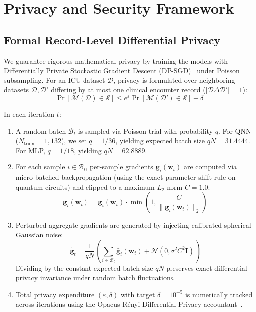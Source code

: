 \documentclass[conference]{IEEEtran}
\begin{document}
\section{Privacy and Security Framework}
\subsection{Formal Record-Level Differential Privacy}
We guarantee rigorous mathematical privacy by training the models with Differentially Private Stochastic Gradient Descent (\textsf{DP-SGD})~\cite{abadi2016deep} under Poisson subsampling. For an ICU dataset $\mathcal{D}$, privacy is formulated over neighboring datasets $\mathcal{D}, \mathcal{D}'$ differing by at most one clinical encounter record ($|\mathcal{D} \Delta \mathcal{D}'| = 1$):
\begin{equation}
    \Pr[\mathcal{M}(\mathcal{D}) \in \mathcal{S}] \le e^\varepsilon \Pr[\mathcal{M}(\mathcal{D}') \in \mathcal{S}] + \delta
\end{equation}

In each iteration $t$:
\begin{enumerate}
    \item A random batch $\mathcal{B}_t$ is sampled via Poisson trial with probability $q$. For QNN ($N_{\text{train}} = 1,132$), we set $q = 1/36$, yielding expected batch size $qN = 31.4444$. For MLP, $q = 1/18$, yielding $qN = 62.8889$.
    \item For each sample $i \in \mathcal{B}_t$, per-sample gradients $\mathbf{g}_i(\mathbf{w}_t)$ are computed via micro-batched backpropagation (using the exact parameter-shift rule on quantum circuits) and clipped to a maximum $L_2$ norm $C = 1.0$:
    \begin{equation}
        \bar{\mathbf{g}}_i(\mathbf{w}_t) = \mathbf{g}_i(\mathbf{w}_t) \cdot \min\left(1, \frac{C}{\|\mathbf{g}_i(\mathbf{w}_t)\|_2}\right)
    \end{equation}
    \item Perturbed aggregate gradients are generated by injecting calibrated spherical Gaussian noise:
    \begin{equation}
        \tilde{\mathbf{g}}_t = \frac{1}{qN} \left( \sum_{i \in \mathcal{B}_t} \bar{\mathbf{g}}_i(\mathbf{w}_t) + \mathcal{N}\left(0, \sigma^2 C^2 \mathbf{I}\right) \right)
    \end{equation}
    Dividing by the constant expected batch size $qN$ preserves exact differential privacy invariance under random batch fluctuations.
    \item Total privacy expenditure $(\varepsilon, \delta)$ with target $\delta = 10^{-5}$ is numerically tracked across iterations using the Opacus Rényi Differential Privacy accountant~\cite{mironov2017renyi,yousefpour2021opacus}.
\end{enumerate}
\end{document}
